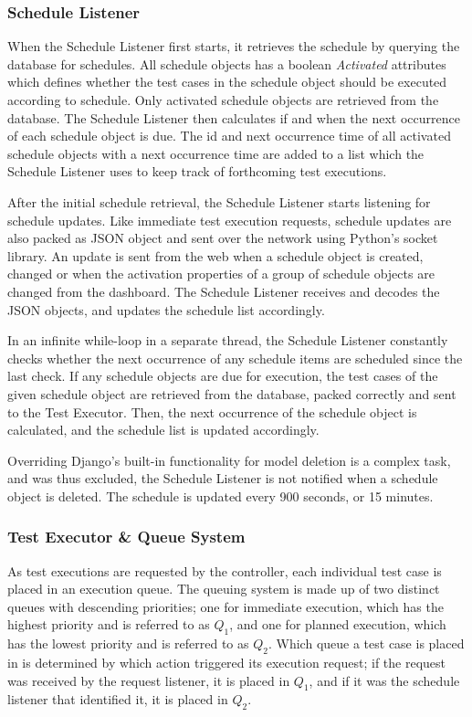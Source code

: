 \subsubsection{Schedule Listener}
When the Schedule Listener first starts, it retrieves the schedule by querying the database for schedules. All schedule objects has a boolean \emph{Activated} attributes which defines whether the test cases in the schedule object should be executed according to schedule. Only activated schedule objects are retrieved from the database. The Schedule Listener then calculates if and when the next occurrence of each schedule object is due. The id and next occurrence time of all activated schedule objects with a next occurrence time are added to a list which the Schedule Listener uses to keep track of forthcoming test executions.

After the initial schedule retrieval, the Schedule Listener starts listening for schedule updates. Like immediate test execution requests, schedule updates are also packed as JSON object and sent over the network using Python's socket library. An update is sent from the web when a schedule object is created, changed or when the activation properties of a group of schedule objects are changed from the dashboard. The Schedule Listener receives and decodes the JSON objects, and updates the schedule list accordingly.

In an infinite while-loop in a separate thread, the Schedule Listener constantly checks whether the next occurrence of any schedule items are scheduled since the last check. If any schedule objects are due for execution, the test cases of the given schedule object are retrieved from the database, packed correctly and sent to the Test Executor. Then, the next occurrence of the schedule object is calculated, and the schedule list is updated accordingly.

Overriding Django's built-in functionality for model deletion is a complex task, and was thus excluded, the Schedule Listener is not notified when a schedule object is deleted. The schedule is updated every 900 seconds, or 15 minutes. 

\subsubsection{Test Executor \& Queue System}

As test executions are requested by the controller, each individual test case is placed in an execution queue. The queuing system is made up of two distinct queues with descending priorities; one for immediate execution, which has the highest priority and is referred to as $Q_1$, and one for planned execution, which has the lowest priority and is referred to as $Q_2$. Which queue a test case is placed in is determined by which action triggered its execution request; if the request was received by the request listener, it is placed in $Q_1$, and if it was the schedule listener that identified it, it is placed in $Q_2$.

